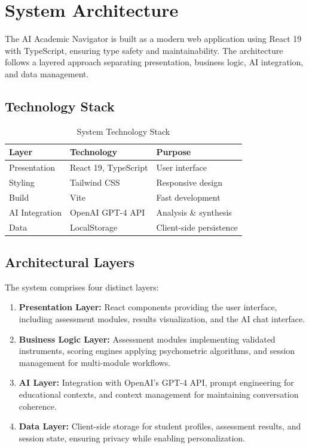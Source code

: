 \documentclass[11pt,a4paper]{article}
\begin{document}
\section{System Architecture}

The AI Academic Navigator is built as a modern web application using React 19 with TypeScript, ensuring type safety and maintainability. The architecture follows a layered approach separating presentation, business logic, AI integration, and data management.

\subsection{Technology Stack}

\begin{table}[H]
\centering
\caption{System Technology Stack}
\label{tab:techstack}
\begin{tabular}{@{}lll@{}}
\toprule
\textbf{Layer} & \textbf{Technology} & \textbf{Purpose} \\
\midrule
Presentation & React 19, TypeScript & User interface \\
Styling & Tailwind CSS & Responsive design \\
Build & Vite & Fast development \\
AI Integration & OpenAI GPT-4 API & Analysis \& synthesis \\
Data & LocalStorage & Client-side persistence \\
\bottomrule
\end{tabular}
\end{table}

\subsection{Architectural Layers}

The system comprises four distinct layers:

\begin{enumerate}[noitemsep]
    \item \textbf{Presentation Layer:} React components providing the user interface, including assessment modules, results visualization, and the AI chat interface.

    \item \textbf{Business Logic Layer:} Assessment modules implementing validated instruments, scoring engines applying psychometric algorithms, and session management for multi-module workflows.

    \item \textbf{AI Layer:} Integration with OpenAI's GPT-4 API, prompt engineering for educational contexts, and context management for maintaining conversation coherence.

    \item \textbf{Data Layer:} Client-side storage for student profiles, assessment results, and session state, ensuring privacy while enabling personalization.
\end{enumerate}
\end{document}
